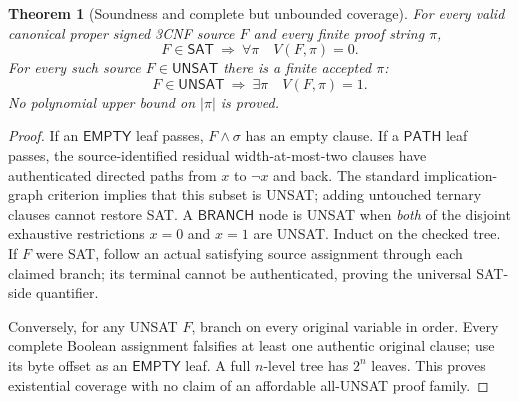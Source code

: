 \documentclass[11pt]{article}
\newtheorem{theorem}{Theorem}
\newcommand{\SAT}{\mathsf{SAT}}
\newcommand{\UNSAT}{\mathsf{UNSAT}}
\begin{document}
\begin{theorem}[Soundness and complete but unbounded coverage]\label{th:coverage}
For every valid canonical proper signed 3CNF source $F$ and every finite proof string $\pi$,
\[
F\in\SAT\ \Longrightarrow\ \forall\pi\quad V(F,\pi)=0.
\]
For every such source $F\in\UNSAT$ there is a finite accepted $\pi$:
\[
F\in\UNSAT\ \Longrightarrow\ \exists\pi\quad V(F,\pi)=1.
\]
No polynomial upper bound on $\lvert\pi\rvert$ is proved.
\end{theorem}
\begin{proof}
If an $\mathsf{EMPTY}$ leaf passes, $F\land\sigma$ has an empty clause. If a $\mathsf{PATH}$ leaf passes, the source-identified residual width-at-most-two clauses have authenticated directed paths from $x$ to $\neg x$ and back. The standard implication-graph criterion implies that this subset is UNSAT; adding untouched ternary clauses cannot restore SAT. A $\mathsf{BRANCH}$ node is UNSAT when \emph{both} of the disjoint exhaustive restrictions $x=0$ and $x=1$ are UNSAT. Induct on the checked tree. If $F$ were SAT, follow an actual satisfying source assignment through each claimed branch; its terminal cannot be authenticated, proving the universal SAT-side quantifier.

Conversely, for any UNSAT $F$, branch on every original variable in order. Every complete Boolean assignment falsifies at least one authentic original clause; use its byte offset as an $\mathsf{EMPTY}$ leaf. A full $n$-level tree has $2^n$ leaves. This proves existential coverage with no claim of an affordable all-UNSAT proof family.
\end{proof}
\end{document}
